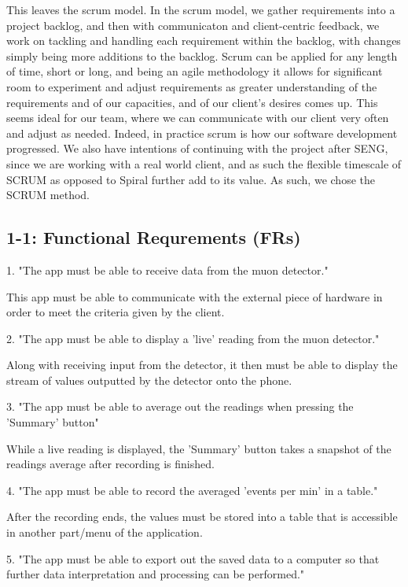 \documentclass[11pt,a4paper]{article}
\begin{document}
This leaves the scrum model. In the scrum model, we gather requirements into a project backlog, and then with communicaton and client-centric feedback, we work on tackling and handling each requirement within the backlog, with changes simply being more additions to the backlog. Scrum can be applied for any length of time, short or long, and being an agile methodology it allows for significant room to experiment and adjust requirements as greater understanding of the requirements and of our capacities, and of our client's desires comes up. This seems ideal for our team, where we can communicate with our client very often and adjust as needed. Indeed, in practice scrum is how our software development progressed. We also have intentions of continuing with the project after SENG, since we are working with a real world client, and as such the flexible timescale of SCRUM as opposed to Spiral further add to its value. As such, we chose the SCRUM method.


\subsection*{1-1: Functional Requrements (FRs)}

\vskip 3mm

1. "The app must be able to receive data from the muon detector."

This app must be able to communicate with the external piece of hardware in order to meet the criteria given by the client. 

\vskip 6mm

2. "The app must be able to display a 'live' reading from the muon detector."

Along with receiving input from the detector, it then must be able to display the stream of values outputted by the detector onto the phone. 

\vskip 6mm

3. "The app must be able to average out the readings when pressing the 'Summary' button"

While a live reading is displayed, the 'Summary' button takes a snapshot of the readings average after recording is finished. 

\vskip 6mm
4. "The app must be able to record the averaged  'events per min' in a table." 

After the recording ends, the values must be stored into a table that is accessible in another part/menu of the application.

\vskip 6mm
5. "The app must be able to export out the saved data to a computer so that further data interpretation and processing can be performed."
\end{document}
